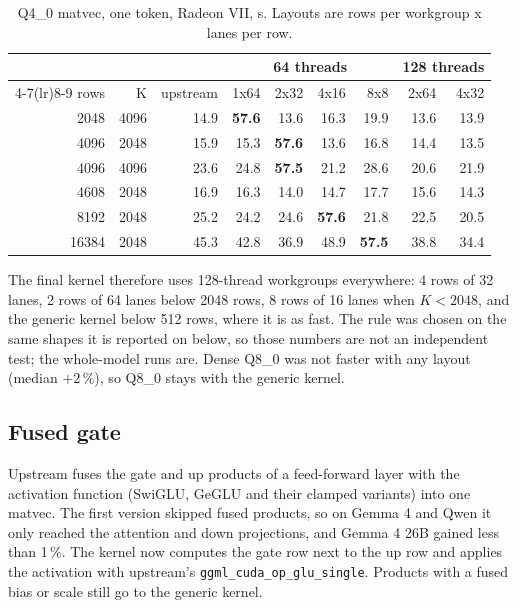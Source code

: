 \documentclass[11pt,a4paper]{article}
\newcommand{\code}[1]{\texttt{#1}}
\begin{document}
\begin{table}[ht]
\centering
\caption{Q4\_0 matvec, one token, Radeon VII, \textmu s. Layouts are rows per workgroup x lanes per row.}
\label{tab:floor}
\begin{tabular}{rrr rrrr rr}
\toprule
& & & \multicolumn{4}{c}{64 threads} & \multicolumn{2}{c}{128 threads} \\
\cmidrule(lr){4-7}\cmidrule(lr){8-9}
rows & K & upstream & 1x64 & 2x32 & 4x16 & 8x8 & 2x64 & 4x32 \\
\midrule
 2048 & 4096 & 14.9 & \textbf{57.6} & 13.6 & 16.3 & 19.9 & 13.6 & 13.9 \\
 4096 & 2048 & 15.9 & 15.3 & \textbf{57.6} & 13.6 & 16.8 & 14.4 & 13.5 \\
 4096 & 4096 & 23.6 & 24.8 & \textbf{57.5} & 21.2 & 28.6 & 20.6 & 21.9 \\
 4608 & 2048 & 16.9 & 16.3 & 14.0 & 14.7 & 17.7 & 15.6 & 14.3 \\
 8192 & 2048 & 25.2 & 24.2 & 24.6 & \textbf{57.6} & 21.8 & 22.5 & 20.5 \\
16384 & 2048 & 45.3 & 42.8 & 36.9 & 48.9 & \textbf{57.5} & 38.8 & 34.4 \\
\bottomrule
\end{tabular}
\end{table}

The final kernel therefore uses 128-thread workgroups everywhere: 4 rows of 32 lanes, 2 rows of 64 lanes below 2048
rows, 8 rows of 16 lanes when $K < 2048$, and the generic kernel below 512 rows, where it is as fast. The rule was
chosen on the same shapes it is reported on below, so those numbers are not an independent test; the whole-model
runs are. Dense Q8\_0 was not faster with any layout (median $+2\,\%$), so Q8\_0 stays with the generic kernel.

\subsection{Fused gate}

Upstream fuses the gate and up products of a feed-forward layer with the activation function (SwiGLU, GeGLU and their
clamped variants) into one matvec. The first version skipped fused products, so on Gemma 4 and Qwen it only reached
the attention and down projections, and Gemma 4 26B gained less than 1\,\%. The kernel now computes the gate row next
to the up row and applies the activation with upstream's \code{ggml\_cuda\_op\_glu\_single}. Products with a fused
bias or scale still go to the generic kernel.
\end{document}
